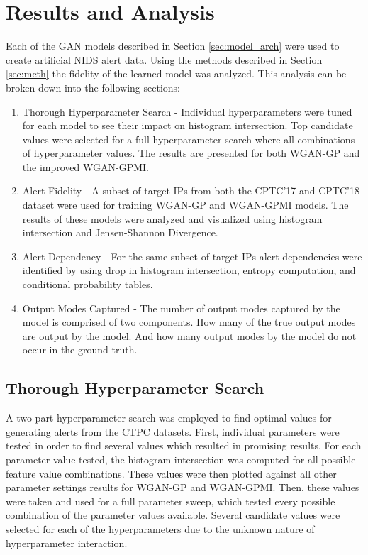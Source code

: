 \chapter{Results and Analysis}
\label{sec:rna}


Each of the GAN models described in Section \ref{sec:model_arch} were used to create artificial NIDS alert data.  Using the methods described in Section \ref{sec:meth} the fidelity of the learned model was analyzed. This analysis can be broken down into the following sections:

\begin{enumerate}
	\item Thorough Hyperparameter Search - Individual hyperparameters were tuned for each model to see their impact on histogram intersection. Top candidate values were selected for a full hyperparameter search where all combinations of hyperparameter values. The results are presented for both WGAN-GP and the improved WGAN-GPMI.
	
	\item Alert Fidelity - A subset of target IPs from both the CPTC'17 and CPTC'18 dataset were used for training WGAN-GP and WGAN-GPMI models. The results of these models were analyzed and visualized using histogram intersection and Jensen-Shannon Divergence.
	
	\item Alert Dependency - For the same subset of target IPs alert dependencies were identified by using drop in histogram intersection, entropy computation, and conditional probability tables.
	
	\item Output Modes Captured - The number of output modes captured by the model is comprised of two components. How many of the true output modes are output by the model. And how many output modes by the model do not occur in the ground truth. 

\end{enumerate}

\section{Thorough Hyperparameter Search}
\label{sec:search}
A two part hyperparameter search was employed to find optimal values for generating alerts from the CTPC datasets. First, individual parameters were tested in order to find several values which resulted in promising results. For each parameter value tested, the histogram intersection was computed for all possible feature value combinations. These values were then plotted against all other parameter settings results for WGAN-GP and WGAN-GPMI. Then, these values were taken and used for a full parameter sweep, which tested every possible combination of the parameter values available. Several candidate values were selected for each of the hyperparameters due to the unknown nature of hyperparameter interaction.

